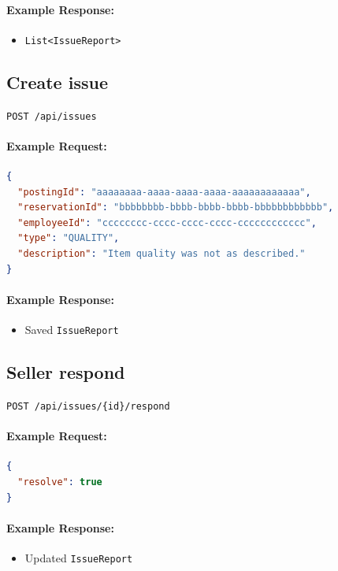 \documentclass[a4paper,11pt]{article}
\begin{document}
\paragraph{Example Response:}
\begin{itemize}
    \item \texttt{List<IssueReport>}
\end{itemize}

\subsection{Create issue}
\texttt{POST /api/issues}

\paragraph{Example Request:}
\begin{lstlisting}[language=json]
{
  "postingId": "aaaaaaaa-aaaa-aaaa-aaaa-aaaaaaaaaaaa",
  "reservationId": "bbbbbbbb-bbbb-bbbb-bbbb-bbbbbbbbbbbb",
  "employeeId": "cccccccc-cccc-cccc-cccc-cccccccccccc",
  "type": "QUALITY",
  "description": "Item quality was not as described."
}
\end{lstlisting}

\paragraph{Example Response:}
\begin{itemize}
    \item Saved \texttt{IssueReport}
\end{itemize}

\subsection{Seller respond}
\texttt{POST /api/issues/\{id\}/respond}

\paragraph{Example Request:}
\begin{lstlisting}[language=json]
{
  "resolve": true
}
\end{lstlisting}

\paragraph{Example Response:}
\begin{itemize}
    \item Updated \texttt{IssueReport}
\end{itemize}
\end{document}
